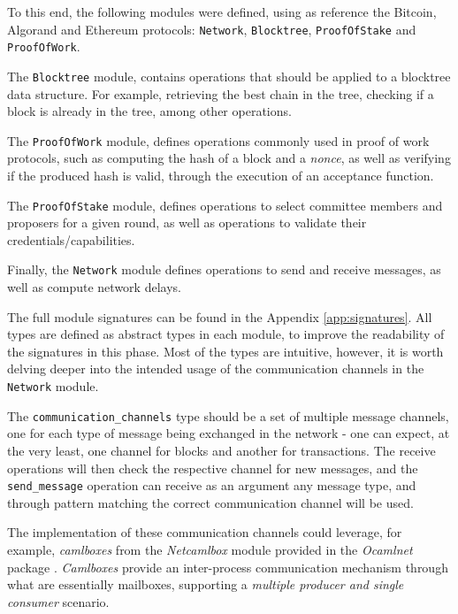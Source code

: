 To this end, the following modules were defined, using as reference the Bitcoin, Algorand and Ethereum protocols: \texttt{Network}, \texttt{Blocktree}, \texttt{ProofOfStake} and \texttt{ProofOfWork}.

The \texttt{Blocktree} module, contains operations that should be applied to a blocktree data structure. For example, retrieving the best chain in the tree, checking if a block is already in the tree, among other operations.

The \texttt{ProofOfWork} module, defines operations commonly used in proof of work protocols, such as computing the hash of a block and a \textit{nonce}, as well as verifying if the produced hash is valid, through the execution of an acceptance function.

The \texttt{ProofOfStake} module, defines operations to select committee members and proposers for a given round, as well as operations to validate their credentials/capabilities.

Finally, the \texttt{Network} module defines operations to send and receive messages, as well as compute network delays.

The full module signatures can be found in the Appendix \ref{app:signatures}. All types are defined as abstract types in each module, to improve the readability of the signatures in this phase. Most of the types are intuitive, however, it is worth delving deeper into the intended usage of the communication channels in the \texttt{Network} module.

The \texttt{communication\_channels} type should be a set of multiple message channels, one for each type of message being exchanged in the network - one can expect, at the very least, one channel for blocks and another for transactions. The receive operations will then check the respective channel for new messages, and the \texttt{send\_message} operation can receive as an argument any message type, and through pattern matching the correct communication channel will be used.

The implementation of these communication channels could leverage, for example, \textit{camlboxes} from the \textit{Netcamlbox} module provided in the \textit{Ocamlnet} package \cite{ocamlnet}. \textit{Camlboxes} provide an inter-process communication mechanism through what are essentially mailboxes, supporting a \textit{multiple producer and single consumer} scenario.











